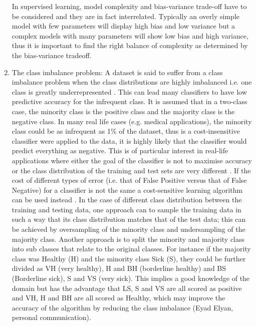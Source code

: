 \begin{enumerate}
In supervised learning, model complexity and bias-variance trade-off have to be considered and they are in fact interrelated. Typically an overly simple model with few parameters will display high bias and low variance \citep{Anonymous:vm} but a complex models with many parameters will show low bias and high variance, thus it is important to find the right balance of complexity as determined by the bias-variance tradeoff.

\item{The class imbalance problem:}\newline
A dataset is said to suffer from a class imbalance problem when the class distributions are highly imbalanced i.e. one class is greatly underrepresented \citep{Ling:2017jm}. This can lead many classifiers to have low predictive accuracy for the infrequent class. It is assumed that in a two-class case, the minority class is the positive class and the majority class is the negative class. In many real life cases (e.g. medical applications), the minority class could be as infrequent as 1\% of the dataset, thus is a cost-insensitive classifier were applied to the data, it is highly likely that the classifier would predict everything as negative. This is of particular interest in real-life applications where either the goal of the classifier is not to maximise accuracy or the class distribution of the training and test sets are very different \citep{Ling:2017jm}.\newline
If the cost of different types of error (i.e. that of False Positive versus that of False Negative) for a classifier is not the same a cost-sensitive learning algorithm can be used instead \citep{Ling:2017jm}.\newline
In the case of different class distribution between the training and testing data, one approach can to sample the training data in such a way that its class distribution matches that of the test data; this can be achieved by oversampling of the minority class and undersampling of the majority class. \newline
Another approach is to split the minority and majority class into sub classes that relate to the original classes. For instance if the majority class was Healthy (H) and the minority class Sick (S), they could be further divided as VH (very healthy), H and BH (borderline healthy) and BS (Borderline sick), S and VS (very sick). This implies a good knowledge of the domain but has the advantage that LS, S and VS are all scored as positive and VH, H and BH are all scored as Healthy, which may improve the accuracy of the algorithm by reducing the class imbalance (Eyad Elyan, personal communication).
\end{enumerate}

